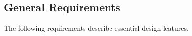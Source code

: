 



%
%




\subsection{General Requirements}
\label{sec:genreq}

The following requirements describe essential design features.

